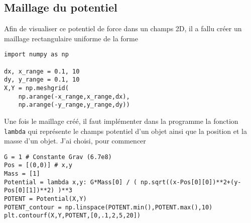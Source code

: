 \subsection{Maillage du potentiel}
Afin de visualiser ce potentiel de force dans un champs 2D, il a fallu créer un maillage rectangulaire uniforme de la forme
\begin{verbatim}
import numpy as np

dx, x_range = 0.1, 10
dy, y_range = 0.1, 10
X,Y = np.meshgrid(
    np.arange(-x_range,x_range,dx),
    np.arange(-y_range,y_range,dy))
\end{verbatim}
Une fois le maillage créé, il faut implémenter dans la programme la fonction \verb!lambda! qui représente le champs potentiel d'un objet ainsi que la position et la masse d'un objet. J'ai choisi, pour commencer
\begin{verbatim}
G = 1 # Constante Grav (6.7e8)
Pos = [(0,0)] # x,y
Mass = [1]
Potential = lambda x,y: G*Mass[0] / ( np.sqrt((x-Pos[0][0])**2+(y-Pos[0][1])**2) )**3
POTENT = Potential(X,Y)
POTENT_contour = np.linspace(POTENT.min(),POTENT.max(),10)
plt.contourf(X,Y,POTENT,[0,.1,2,5,20])
\end{verbatim}